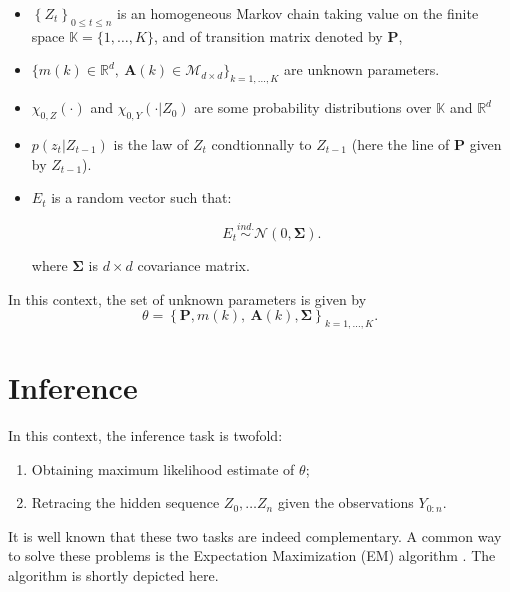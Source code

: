 \documentclass[]{book}
\providecommand{\tightlist}{%
  \setlength{\itemsep}{0pt}\setlength{\parskip}{0pt}}
\begin{document}
\begin{itemize}
\tightlist
\item
  \(\left\lbrace Z_t \right\rbrace_{0\leq t \leq n}\) is an homogeneous
  Markov chain taking value on the finite space
  \(\mathbb{K} = \lbrace1,\dots, K \rbrace\), and of transition matrix
  denoted by \(\mathbf{P}\),
\item
  \(\lbrace m(k)\in\mathbb{R}^d,~\mathbf{A}(k)\in \mathcal{M}_{d\times d}\rbrace_{k = 1,\dots, K}\)
  are unknown parameters.
\item
  \(\chi_{0, Z}(\cdot)\) and \(\chi_{0, Y}(\cdot \vert Z_0)\) are some
  probability distributions over \(\mathbb{K}\) and \(\mathbb{R}^d\)
\item
  \(p(z_t\vert Z_{t-1})\) is the law of \(Z_t\) condtionnally to
  \(Z_{t - 1}\) (here the line of \(\mathbf{P}\) given by
  \(Z_{t - 1}\)).
\item
  \(E_t\) is a random vector such that:

  \begin{equation*}
  E_t \overset{ind.}{\sim} \mathcal{N}\left(0, \mathbf{\Sigma}\right).
  \end{equation*}

  where \(\mathbf{\Sigma}\) is \(d\times d\) covariance matrix.
\end{itemize}

In this context, the set of unknown parameters is given by
\[\theta = \left\lbrace \mathbf{P}, m(k),~\mathbf{A}(k), \mathbf{\Sigma}\right \rbrace_{k = 1,\dots, K}.\]

\section{Inference}\label{inference}

In this context, the inference task is twofold:

\begin{enumerate}
\def\labelenumi{\arabic{enumi}.}
\tightlist
\item
  Obtaining maximum likelihood estimate of \(\theta\);
\item
  Retracing the hidden sequence \(Z_0,\dots Z_n\) given the observations
  \(Y_{0:n}\).
\end{enumerate}

It is well known that these two tasks are indeed complementary. A common
way to solve these problems is the Expectation Maximization (EM)
algorithm \citep{dempster1977maximum}. The algorithm is shortly depicted
here.
\end{document}
